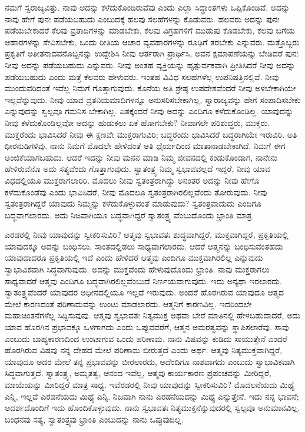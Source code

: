 \vskip 0.2cm 

ನಮಗೆ ಸ್ವರಾಜ್ಯವಿತ್ತು. ನಾವು ಅದನ್ನು ಕಳೆದುಕೊಂಡಿರುವೆವು ಎಂದು ಎಲ್ಲಾ ಸಿದ್ಧಾಂತಗಳು ಒಪ್ಪಿಕೊಂಡಿವೆ. ಅದನ್ನು ನಾವು ಹೇಗೆ ಪುನಃ ಪಡೆಯಬಹುದು ಎಂಬುದಕ್ಕೆ ಹಲವು ಸಲಹೆಗಳನ್ನು ಕೊಡುವರು. ಹಲವರು ಅದನ್ನು ಪುನಃ ಪಡೆಯಬೇಕಾದರೆ ಕೆಲವು ವ್ರತಾದಿಗಳನ್ನು ಮಾಡಬೇಕು, ಕೆಲವು ವಿಗ್ರಹಗಳಿಗೆ ಮುಡುಪು ಕೊಡಬೇಕು, ಕೆಲವು ಬಗೆಯ ಆಹಾರಗಳನ್ನು ಸೇವಿಸಬೇಕು, ಒಂದು ರೀತಿಯ ಆಚಾರ ವ್ಯವಹಾರಗಳನ್ನು ರೂಢಿಗೆ ತರಬೇಕು ಎನ್ನುವರು. ಮತ್ತೊಬ್ಬರು ಪ್ರಕೃತಿಗೆ ಅತೀತನಾದವನೊಬ್ಬನನ್ನು ಉದ್ದೇಶಿಸಿ ನೀವು ಆರ್ತರಾಗಿ ಪ್ರಾರ್ಥಿಸಿ, ಅವನ ಕ್ಷಮಾಪಣೆಯನ್ನು ಬೇಡಿದರೆ ಪುನಃ ನೀವು ಅದನ್ನು ಪಡೆಯಬಹುದು ಎನ್ನುವರು. ನೀವು ಅಂತಹ ವ್ಯಕ್ತಿಯನ್ನು ಹೃತ್ಪುರ್ವಕವಾಗಿ ಪ್ರೀತಿಸಿದರೆ ನೀವು ಅದನ್ನು ಪಡೆಯಬಹುದು ಎಂದು ಮತ್ತೆ ಕೆಲವರು ಹೇಳುವರು. ಇಂತಹ ವಿವಿಧ ಸಲಹೆಗಳೆಲ್ಲ ಉಪನಿಷತ್ತಿನಲ್ಲಿವೆ. ನೀವು ಮುಂದುವರಿದಂತೆ ಇವೆಲ್ಲ ನಿಮಗೆ ಗೊತ್ತಾಗುವುದು. ಕೊನೆಯ ಅತಿ ಶ್ರೇಷ್ಠ ಉಪದೇಶವೆಂದರೆ ನೀವು ಅಳಬೇಕಾಗಿಯೇ ಇಲ್ಲವೆನ್ನುವುದು. ನೀವು ಯಾವ ವ್ರತನಿಯಮಾದಿಗಳನ್ನೂ ಅನುಸರಿಸಬೇಕಾಗಿಲ್ಲ, ಸ್ವಾರಾಜ್ಯವನ್ನು ಹೇಗೆ ಸಂಪಾದಿಸಬೇಕು ಎನ್ನುವುದನ್ನು ಸ್ವಲ್ಪವೂ ಗಮನಿಸ ಬೇಕಾಗಿಲ್ಲ. ಏತಕ್ಕೆಂದರೆ ನೀವು ಅದನ್ನು ಎಂದಿಗೂ ಕಳೆದುಕೊಂಡಿಲ್ಲ. ಯಾವುದನ್ನು ನೀವು ಕಳೆದುಕೊಂಡಿಲ್ಲವೋ ಅದನ್ನು ಹುಡುಕಲು ಏಕೆ ಹೋಗಬೇಕು? ನೀವಾಗಲೇ ಪರಿಶುದ್ಧರು, ಮುಕ್ತರು. ಮುಕ್ತರೆಂದು ಭಾವಿಸಿದರೆ ನೀವು ಈ ಕ್ಷಣವೇ ಮುಕ್ತರಾಗುವಿರಿ; ಬದ್ಧರೆಂದು ಭಾವಿಸಿದರೆ ಬದ್ಧರಾಗಿಯೇ ಇರುವಿರಿ. ಅತಿ ಧೀರನುಡಿಗಳಿವು. ನಾನು ನಿಮಗೆ ಮೊದಲೇ ಹೇಳಿದಂತೆ ಅತಿ ಧೈರ್ಯದಿಂದ ಮಾತಾನಾಡಬೇಕಾಗಿದೆ. ನಿಮಗೆ ಈಗ ಅಂಜಿಕೆಯಾಗಬಹುದು. ಆದರೆ ಇದನ್ನು ನೀವು ಮನನ ಮಾಡಿ ನಿಮ್ಮ ಜೀವನದಲ್ಲಿ ಕಂಡುಕೊಂಡಾಗ, ನಾನೇನು ಹೇಳಿರುವೆನೊ ಅದು ಸತ್ಯವೆಂದು ಗೊತ್ತಾಗುವುದು. ಸ್ವಾತಂತ್ರ್ಯ ನಿಮ್ಮ ಸ್ವಭಾವವಲ್ಲದೆ ಇದ್ದರೆ, ನೀವು ಯಾವ ವಿಧದಲ್ಲಿಯೂ ಮುಕ್ತರಾಗಲಾರಿರಿ. ಮೊದಲು ನೀವು ಸ್ವತಂತ್ರರಾಗಿದ್ದು ಅನಂತರ ಅದನ್ನು ನೀವು ಹೇಗೊ ಕಳೆದುಕೊಂಡೆವು ಎಂದು ಭಾವಿಸಿದರೆ, ನೀವು ಮೊದಲೂ ಸ್ವತಂತ್ರರಾಗಿರಲಿಲ್ಲವೆಂದು ತೋರುವುದು. ನೀವು ಸ್ವತಂತ್ರರಾಗಿದ್ದರೆ ಯಾವುದು ನಿಮ್ಮನ್ನು ಕಳೆದುಕೊಳ್ಳುವಂತೆ ಮಾಡುವುದು? ಸ್ವತಂತ್ರವಾದುದು ಎಂದಿಗೂ ಬದ್ಧವಾಗಲಾರದು. ಅದು ನಿಜವಾಗಿಯೂ ಬದ್ಧವಾಗಿದ್ದರೆ ಸ್ವಾತಂತ್ರ್ಯ ವೆಂಬುದೊಂದು ಭ್ರಾಂತಿ ಮಾತ್ರ.

\vskip 0.2cm 

ಎರಡರಲ್ಲಿ ನೀವು ಯಾವುದನ್ನು ಸ್ವೀಕರಿಸುವಿರಿ? ಆತ್ಮವು ಸ್ವಭಾವತಃ ಶುದ್ಧವಾಗಿದ್ದರೆ, ಮುಕ್ತವಾಗಿದ್ದರೆ, ಪ್ರಕೃತಿಯಲ್ಲಿ ಯಾವುದಕ್ಕೂ ಅದನ್ನು ಬಂಧಿಸಲು, ಸಾಂತದಲ್ಲಿಡಲು ಸಾಧ್ಯವಾಗಲಾರದು. ಆದರೆ ಆತ್ಮನನ್ನು ಬಂಧಿಸುವಂತಹದು ಯಾವುದಾದರೂ ಪ್ರಕೃತಿಯಲ್ಲಿ ಇದೆ ಎಂದು ಹೇಳಿದರೆ ಆತ್ಮವು ಎಂದಿಗೂ ಮುಕ್ತವಾಗಿರಲಿಲ್ಲ ಎನ್ನುವುದು ಸ್ವಾಭಾವಿಕವಾಗಿ ಸಿದ್ಧವಾಗುವುದು. ಅದನ್ನು ಮುಕ್ತವೆಂದು ಹೇಳುವುದೊಂದು ಭ್ರಾಂತಿ. ನಾವು ಮುಕ್ತರಾಗಲು ಸಾಧ್ಯವಾದರೆ ಆತ್ಮವು ಎಂದಿಗೂ ಬದ್ಧವಾಗಿರಲಿಲ್ಲವೆಂಬುದೆ ನಿರ್ಣಯವಾಗುವುದು. ಇದು ಅನ್ಯಥಾ ಇರಲಾರದು. ಸ್ವಾತಂತ್ರ್ಯವೆಂದರೆ ಯಾವುದರ ಅಧೀನದಲ್ಲಿಯೂ ಇಲ್ಲದೆ ಇರುವುದು. ಅಂದರೆ ಹೊರಗಿರುವ ಯಾವುದೂ ಆತ್ಮದ ಮೇಲೆ ಕಾರಣದಂತೆ ಪರಿಣಾಮವನ್ನು ಉಂಟು ಮಾಡಲಾರದು. ಆತ್ಮನಿಗೆ ಕಾರಣವಿಲ್ಲ. ಇದರಿಂದಲೇ ಮಹಾಚಿಂತನೆಗಳೆಲ್ಲ ಸಿದ್ದಿಸುವುವು. ಆತ್ಮವು ಸ್ವಭಾವತಃ ನಿತ್ಯಮುಕ್ತ ಅಥವಾ ಬೇರೆ ಮಾತಿನಲ್ಲಿ ಹೇಳಬಹುದಾದರೆ, ಅದು ಯಾವ ಹೊರಗಿನ ಪ್ರಭಾವಕ್ಕೂ ಒಳಗಾಗದು ಎಂದು ಒಪ್ಪುವವರೆಗೆ, ಆತ್ಮನ ಅಮರತ್ವವನ್ನು ಸ್ಥಾಪಿಸಲಾರೆವು. ಸಾವು ಎಂಬುದು ಬಾಹ್ಯಕಾರಣದಿಂದ ಉಂಟಾಗುವ ಒಂದು ಪರಿಣಾಮ. ನಾನು ವಿಷವನ್ನು ಕುಡಿದು ಸಾಯುತ್ತೇನೆ ಎಂದರೆ ಹೊರಗಿರುವ ವಿಷವು ನನ್ನ ದೇಹದ ಮೇಲೆ ಪರಿಣಾಮ ಬೀರುತ್ತದೆ ಎಂದು ಅರ್ಥ. ಆತ್ಮವು ನಿತ್ಯಮುಕ್ತವಾಗಿದ್ದರೆ, ಯಾವುದೂ ಅದರ ಮೇಲೆ ತನ್ನ ಪ್ರಭಾವವನ್ನು ಬೀರಲಾರದು, ಅದೆಂದಿಗೂ ನಾಶವಾಗದು ಎಂಬುದು ಸ್ವಾಭಾವಿಕವಾಗಿ ಸಿದ್ಧವಾಗುತ್ತದೆ. ಸ್ವಾತಂತ್ರ್ಯ, ಅಮೃತತ್ವ, ಆನಂದ ಇವೆಲ್ಲ, ಆತ್ಮವು ಕಾರ್ಯಕಾರಣ ಪ್ರಪಂಚವನ್ನು ಮೀರಿದ್ದರೆ, ಮಾಯೆಯನ್ನು ಮೀರಿದ್ದರೆ ಮಾತ್ರ ಸಾಧ್ಯ. ಇವೆರಡರಲ್ಲಿ ನೀವು ಯಾವುದನ್ನು ಸ್ವೀಕರಿಸುವಿರಿ? ಮೊದಲನೆಯದು ಮಿಥ್ಯೆ ಎನ್ನಿ, ಇಲ್ಲವೆ ಎರಡನೆಯದು ಮಿಥ್ಯೆ ಎನ್ನಿ. ನಿಜವಾಗಿ ನಾನು ಎರಡನೆಯದನ್ನು ಮಿಥ್ಯೆ ಎನ್ನುತ್ತೇನೆ. ಇದು ನನ್ನ ಭಾವನೆ; ಆದರ್ಶದೊಂದಿಗೆ ಇದು ಹೊಂದಿಕೊಳ್ಳುವುದು. ನಾನು ಸ್ವಭಾವತಃ ನಿತ್ಯಮುಕ್ತನೆನ್ನುವುದರಲ್ಲಿ ಸ್ವಲ್ಪವೂ ಅನುಮಾನವಿಲ್ಲ. ಬಂಧನವು ಸತ್ಯ, ಸ್ವಾತಂತ್ರ್ಯವು ಭ್ರಾಂತಿ ಎಂಬುದನ್ನು ನಾನು ಒಪ್ಪುವುದಿಲ್ಲ.

